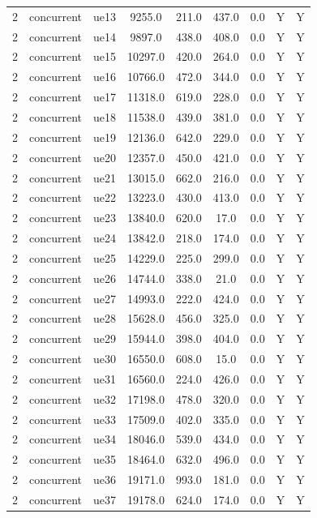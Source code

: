 \begin{table}[ht]
\begin{tabular}{|c|c|c|c|c|c|c|c|c|}
2 & concurrent & ue13 & 9255.0 & 211.0 & 437.0 & 0.0 & Y & Y \\
2 & concurrent & ue14 & 9897.0 & 438.0 & 408.0 & 0.0 & Y & Y \\
2 & concurrent & ue15 & 10297.0 & 420.0 & 264.0 & 0.0 & Y & Y \\
2 & concurrent & ue16 & 10766.0 & 472.0 & 344.0 & 0.0 & Y & Y \\
2 & concurrent & ue17 & 11318.0 & 619.0 & 228.0 & 0.0 & Y & Y \\
2 & concurrent & ue18 & 11538.0 & 439.0 & 381.0 & 0.0 & Y & Y \\
2 & concurrent & ue19 & 12136.0 & 642.0 & 229.0 & 0.0 & Y & Y \\
2 & concurrent & ue20 & 12357.0 & 450.0 & 421.0 & 0.0 & Y & Y \\
2 & concurrent & ue21 & 13015.0 & 662.0 & 216.0 & 0.0 & Y & Y \\
2 & concurrent & ue22 & 13223.0 & 430.0 & 413.0 & 0.0 & Y & Y \\
2 & concurrent & ue23 & 13840.0 & 620.0 & 17.0 & 0.0 & Y & Y \\
2 & concurrent & ue24 & 13842.0 & 218.0 & 174.0 & 0.0 & Y & Y \\
2 & concurrent & ue25 & 14229.0 & 225.0 & 299.0 & 0.0 & Y & Y \\
2 & concurrent & ue26 & 14744.0 & 338.0 & 21.0 & 0.0 & Y & Y \\
2 & concurrent & ue27 & 14993.0 & 222.0 & 424.0 & 0.0 & Y & Y \\
2 & concurrent & ue28 & 15628.0 & 456.0 & 325.0 & 0.0 & Y & Y \\
2 & concurrent & ue29 & 15944.0 & 398.0 & 404.0 & 0.0 & Y & Y \\
2 & concurrent & ue30 & 16550.0 & 608.0 & 15.0 & 0.0 & Y & Y \\
2 & concurrent & ue31 & 16560.0 & 224.0 & 426.0 & 0.0 & Y & Y \\
2 & concurrent & ue32 & 17198.0 & 478.0 & 320.0 & 0.0 & Y & Y \\
2 & concurrent & ue33 & 17509.0 & 402.0 & 335.0 & 0.0 & Y & Y \\
2 & concurrent & ue34 & 18046.0 & 539.0 & 434.0 & 0.0 & Y & Y \\
2 & concurrent & ue35 & 18464.0 & 632.0 & 496.0 & 0.0 & Y & Y \\
2 & concurrent & ue36 & 19171.0 & 993.0 & 181.0 & 0.0 & Y & Y \\
2 & concurrent & ue37 & 19178.0 & 624.0 & 174.0 & 0.0 & Y & Y \\

\end{tabular}
\end{table}
